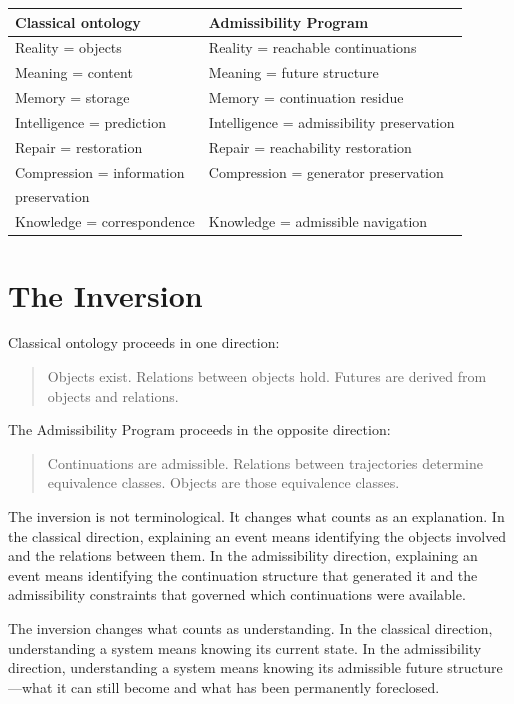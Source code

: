\documentclass[12pt, oneside]{book}
\theoremstyle{flyxion}
\theoremstyle{definition}
\begin{document}
\medskip
\begin{center}
\renewcommand{\arraystretch}{1.4}
\begin{tabular}{ll}
\toprule
Classical ontology & Admissibility Program \\
\midrule
Reality = objects & Reality = reachable continuations \\
Meaning = content & Meaning = future structure \\
Memory = storage & Memory = continuation residue \\
Intelligence = prediction & Intelligence = admissibility
  preservation \\
Repair = restoration & Repair = reachability restoration \\
Compression = information & Compression = generator
  preservation \\
preservation & \\
Knowledge = correspondence & Knowledge = admissible
  navigation \\
\bottomrule
\end{tabular}
\end{center}

\section{The Inversion}

Classical ontology proceeds in one direction:

\begin{quote}
Objects exist. Relations between objects hold. Futures
are derived from objects and relations.
\end{quote}

The Admissibility Program proceeds in the opposite
direction:

\begin{quote}
Continuations are admissible. Relations between
trajectories determine equivalence classes. Objects
are those equivalence classes.
\end{quote}

The inversion is not terminological. It changes what
counts as an explanation. In the classical direction,
explaining an event means identifying the objects
involved and the relations between them. In the
admissibility direction, explaining an event means
identifying the continuation structure that generated
it and the admissibility constraints that governed
which continuations were available.

The inversion changes what counts as understanding.
In the classical direction, understanding a system
means knowing its current state. In the admissibility
direction, understanding a system means knowing its
admissible future structure---what it can still become
and what has been permanently foreclosed.
\end{document}
